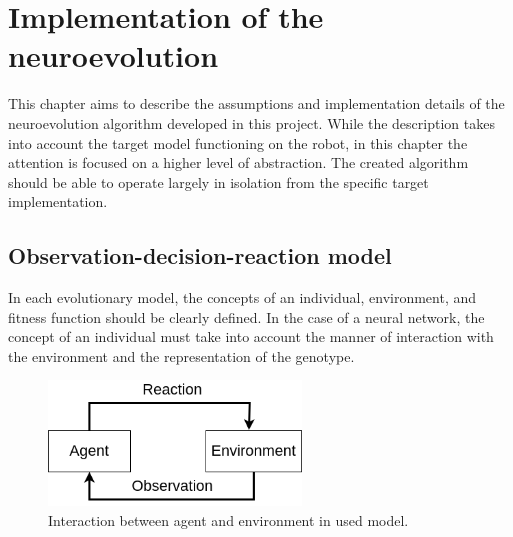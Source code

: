 \FloatBarrier
\chapter{Implementation of the neuroevolution}
This chapter aims to describe the assumptions and implementation details of the neuroevolution 
algorithm developed in this project. 
While the description takes into account the target model functioning on the robot, 
in this chapter the attention is focused on a higher level of abstraction. 
The created algorithm should be able to operate largely in isolation from the specific target 
implementation.



\FloatBarrier
\section{Observation-decision-reaction model}

In each evolutionary model, the concepts of an individual, environment, and fitness function 
should be clearly defined. 
In the case of a neural network, the concept of an individual must take into account the 
manner of interaction with the environment and the representation of the genotype.
\begin{figure}[htb] 
	\centering
	\includegraphics[width=0.6\textwidth]{figures/agent_environment}
	\caption{Interaction between agent and environment in used model.}
	\label{fig:agent_environment}
\end{figure}

